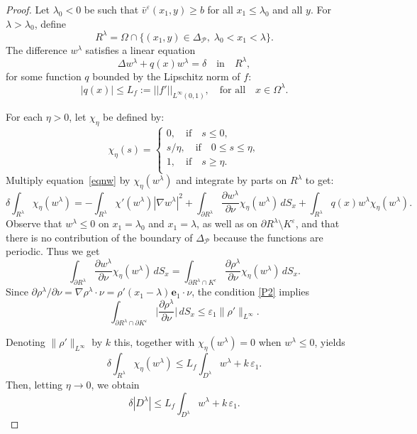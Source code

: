 \documentclass[a4paper,12pt,fullpage]{article}
\numberwithin{equation}{section}
\def\ep{\varepsilon}
\begin{document}
\begin{proof}
Let $\lambda_0<0$ be such that $\bar{v}^\ep(x_1,y)\geq b$ for all $x_1\leq \lambda_0$ and all $y$. For $\lambda>\lambda_0$, define
\[ 
R^\lambda =\Omega \cap \{ (x_1, y) \in \Delta_{\mathcal P} , \; \lambda_0< x_1 < \lambda \}.
\]
The difference $w^\lambda$ satisfies a linear equation 
\begin{equation}\label{eqnw}
\Delta w^\lambda + q(x) w^\lambda = \delta \quad\text{in} \quad R^\lambda,
\end{equation}
for some function $q$  bounded by the Lipschitz norm of $f$:
\[
| q(x)| \leq L_f:= || f' ||_{L^\infty(0,1)}, \quad\text{for all}\quad x\in \Omega^\lambda.
\]

For each $\eta >0$, let $\chi_\eta$ be defined by:
\begin{equation*}
\chi_\eta(s) =
    \begin{cases}
    0,\quad \text{if} \quad s\leq 0,\\
    s/\eta,\quad \text{if} \quad 0\leq s\leq \eta,\\
    1,\quad \text{if} \quad s\geq \eta.\\
    \end{cases}
\end{equation*}
Multiply equation~\eqref{eqnw} by $\chi_\eta(w^\lambda)$ and integrate by parts on $R^\lambda$ to get:
\begin{equation}
\delta \int_{R^\lambda} \chi_\eta(w^\lambda) = - \int_{R^\lambda} \chi'(w^\lambda) |\nabla w^\lambda|^2 + \int_{\partial R^\lambda}\frac{\partial w^\lambda}{\partial\nu} \chi_\eta(w^\lambda)\,dS_x + \int_{R^\lambda} q(x) w^\lambda \chi_\eta(w^\lambda).  
\end{equation}
Observe that $w^\lambda \leq 0$ on $x_1= \lambda_0$ and $x_1 = \lambda$, as well as on $\partial R^\lambda\setminus K^\ep$, and that there is no contribution of the boundary of $\Delta_{\mathcal P}$ because the functions are periodic. Thus we get
\[
\int_{\partial R^\lambda}\frac{\partial w^\lambda}{\partial\nu} \chi_\eta(w^\lambda)\,dS_x =
\int_{\partial R^\lambda \cap K^\epsilon }\frac{\partial \rho^\lambda}{\partial\nu} \chi_\eta(w^\lambda)\,dS_x.
\]
Since $\partial \rho^\lambda/\partial \nu=\nabla \rho^\lambda\cdot \nu=\rho'(x_1-\lambda)\hspace{1pt}{\boldsymbol e}_1\cdot \nu$, the condition \eqref{P2} implies
\[
\int_{\partial R^\lambda\cap\partial K^\ep}\Big|\frac{\partial \rho^\lambda}{\partial\nu}\Big|\,dS_x\leq  \ep_1\|\rho'\|_{L^\infty}.
\]

Denoting $\|\rho'\|_{L^\infty}$ by $k$ this, together with $\chi_\eta(w^\lambda)=0$ when $w^\lambda\le0$, yields
\[
\delta \int_{R^\lambda} \chi_\eta(w^\lambda) \leq L_f \int_{D^\lambda} w^\lambda + k \,\ep_1.
\]
Then, letting $\eta\to 0$, we obtain
\begin{equation} \label{estD1}
\delta|D^\lambda|\leq L_f \int_{D^\lambda} w^\lambda + k \,\ep_1.
\end{equation}


\end{proof}
\end{document}
